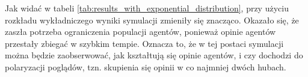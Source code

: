 Jak widać w tabeli \ref{tab:results_with_exponential_distribution}, przy użyciu rozkładu wykładniczego wyniki symulacji zmieniły się znacząco.
Okazało się, że zaszła potrzeba ograniczenia populacji agentów, ponieważ opinie agentów przestały zbiegać w szybkim tempie.
Oznacza to, że w tej postaci symulacji można będzie zaobserwować, jak kształtują się opinie agentów, i czy dochodzi do polaryzacji poglądów,
tzn. skupienia się opinii w co najmniej dwóch hubach.